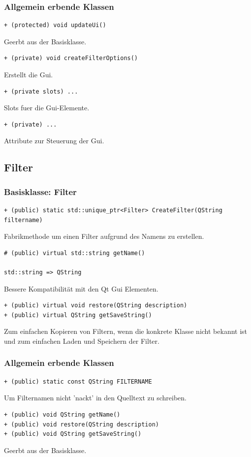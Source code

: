 \documentclass{scrartcl}
\begin{document}
{\subsubsection{Allgemein erbende Klassen}
\bigskip
\begin{verbatim}
+ (protected) void updateUi()
\end{verbatim}
Geerbt aus der Basisklasse.
\bigskip
\begin{verbatim}
+ (private) void createFilterOptions()
\end{verbatim}
Erstellt die Gui.
\bigskip
\begin{verbatim}
+ (private slots) ...
\end{verbatim}
Slots fuer die Gui-Elemente.
\bigskip
\begin{verbatim}
+ (private) ...
\end{verbatim}
Attribute zur Steuerung der Gui.
\newpage
\subsection{Filter}
\subsubsection{Basisklasse: Filter}
\bigskip
\begin{verbatim}
+ (public) static std::unique_ptr<Filter> CreateFilter(QString filtername)
\end{verbatim}
Fabrikmethode um einen Filter aufgrund des Namens zu erstellen.
\bigskip
\begin{verbatim}
# (public) virtual std::string getName()

std::string => QString
\end{verbatim}
Bessere Kompatibilität mit den Qt Gui Elementen.
\bigskip
\begin{verbatim}
+ (public) virtual void restore(QString description)
+ (public) virtual QString getSaveString()
\end{verbatim}
Zum einfachen Kopieren von Filtern, wenn die konkrete Klasse nicht bekannt ist und zum einfachen Laden und Speichern der Filter.
\bigskip
\subsubsection{Allgemein erbende Klassen}
\begin{verbatim}
+ (public) static const QString FILTERNAME
\end{verbatim}
Um Filternamen nicht 'nackt' in den Quelltext zu schreiben.
\bigskip
\begin{verbatim}
+ (public) void QString getName()
+ (public) void restore(QString description)
+ (public) void QString getSaveString()
\end{verbatim}
Geerbt aus der Basisklasse. 
\newpage
}
\end{document}
